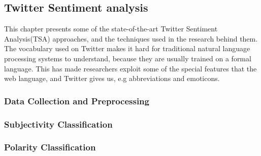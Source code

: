 \subsection{Twitter Sentiment analysis}
	This chapter presents some of the state-of-the-art Twitter Sentiment Analysis(TSA) approaches, and the techniques used in the research behind them. The vocabulary used on Twitter makes it hard for traditional natural language processing systems to understand, because they are usually trained on a formal language. This has made researchers exploit some of the special features that the web language, and Twitter gives us, e.g abbreviations and emoticons.
	
		\subsubsection{Data Collection and Preprocessing}
		
		
		\subsubsection{Subjectivity Classification}
		
		
		\subsubsection{Polarity Classification}
		